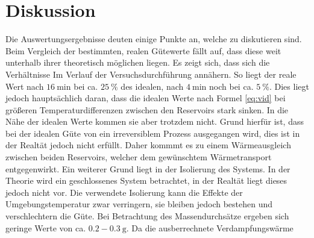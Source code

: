 
\section{Diskussion}
\label{sec:Diskussion}
Die Auswertungsergebnisse deuten einige Punkte an, welche zu diskutieren sind.
Beim Vergleich der bestimmten, realen Gütewerte fällt auf, dass diese weit
unterhalb ihrer theoretisch möglichen liegen. Es zeigt sich, dass sich die
Verhältnisse Im Verlauf der Versuchsdurchführung annähern. So liegt der reale
Wert nach $\SI{16}{\minute}$ bei ca. $\SI{25}{\percent}$ des idealen, nach
$\SI{4}{\minute}$ noch bei ca. $\SI{5}{\percent}$. Dies liegt jedoch
hauptsächlich daran, dass die idealen Werte nach Formel \ref{eq:vid} bei
größeren Temperaturdifferenzen zwischen den Reservoirs stark sinken. In die Nähe
der idealen Werte kommen sie aber trotzdem nicht. Grund hierfür ist, dass bei der
idealen Güte von ein irreversiblem Prozess ausgegangen wird, dies ist in der
Realtät jedoch nicht erfüllt. Daher kommmt es zu einem Wärmeausgleich zwischen
beiden Reservoirs, welcher dem gewünschtem Wärmetransport entgegenwirkt. Ein
weiterer Grund liegt in der Isolierung des Systems. In der Theorie wird
ein geschlossenes System betrachtet, in der Realtät liegt dieses jedoch nicht
vor. Die verwendete Isolierung kann die Effekte der Umgebungstemperatur zwar
verringern, sie bleiben jedoch bestehen und verschlechtern die Güte. Bei
Betrachtung des Massendurchsätze ergeben sich geringe Werte von ca.
$0.2-\SI{0.3}{\gram}$. Da die ausberrechnete Verdampfungswärme 
